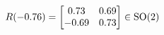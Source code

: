 \documentclass[preview]{standalone}
\begin{document}
\begin{align*}
\special{dvisvgm:raw <g id='unique000'>}R(-0.76) = \begin{bmatrix} 0.73 & 0.69 \\ -0.69 & 0.73 \end{bmatrix} \in \text{SO}(2)\special{dvisvgm:raw </g>}
\end{align*}
\end{document}
